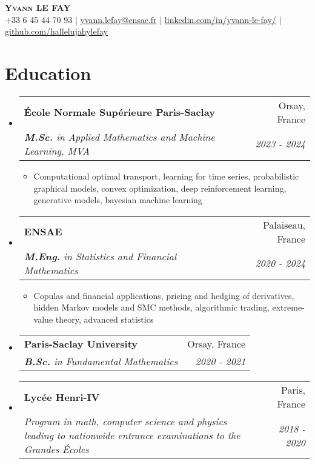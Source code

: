 \documentclass[letterpaper,10pt]{article}
\makeatletter
\newcommand{\resumeItem}[1]{
    \item\small{
            {#1 \vspace{-2pt}}
    }
}
\newcommand{\resumeSubheading}[4]{
    \vspace{-2pt}\item
    \begin{tabular*}{0.97\textwidth}[t]{l@{\extracolsep{\fill}}r}
        \textbf{#1}       & #2                 \\
        \textit{\small#3} & \textit{\small #4} \\
    \end{tabular*}\vspace{-7pt}
}
\newcommand{\resumeSubHeadingListStart}{\begin{itemize}[leftmargin=0.15in, label={}]}
\newcommand{\resumeSubHeadingListEnd}{\end{itemize}}
\newcommand{\resumeItemListStart}{\begin{itemize}}
\newcommand{\resumeItemListEnd}{\end{itemize}\vspace{-5pt}}
\makeatother
\begin{document}

\begin{center}
\textbf{\scshape Yvann LE FAY} \\ \vspace{1pt}
\small +33 6 45 44 70 93 $|$ \href{mailto:yvann.lefay@ensae.fr}{yvann.lefay@ensae.fr} $|$
\href{https://linkedin.com/in/yvann-le-fay/}{linkedin.com/in/yvann-le-fay/} $|$
\href{https://github.com/hallelujahylefay}{github.com/hallelujahylefay}
\end{center}


\section{Education}
\resumeSubHeadingListStart
\resumeSubheading
{\'Ecole Normale Supérieure Paris-Saclay}{Orsay, France}{\textbf{M.Sc.} in Applied Mathematics and Machine Learning, MVA}{2023 - 2024}
\resumeItemListStart
\resumeItem{Computational optimal transport, learning for time series, probabilistic graphical models, convex optimization, deep reinforcement learning, generative models, bayesian machine learning}
\resumeItemListEnd
\resumeSubheading
{ENSAE}{Palaiseau, France}{\textbf{M.Eng.} in Statistics and Financial Mathematics}{2020 - 2024}
\resumeItemListStart
\resumeItem{Copulas and financial applications, pricing and hedging of derivatives, hidden Markov models and SMC methods, algorithmic trading, extreme-value theory, advanced statistics}
\resumeItemListEnd
\resumeSubheading
{Paris-Saclay University}{Orsay, France}{\textbf{B.Sc.} in Fundamental Mathematics }
{2020 - 2021}
\resumeSubheading{Lycée Henri-IV}{Paris, France}
{Program in math, computer science and physics leading to nationwide entrance examinations to the \textit{Grandes Écoles}}{2018 - 2020}
\resumeSubHeadingListEnd
\end{document}
